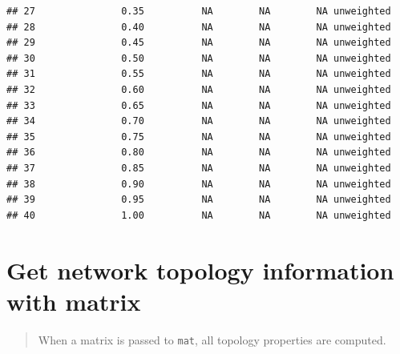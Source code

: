 \documentclass[
]{book}
\begin{document}
\begin{verbatim}
## 27               0.35          NA        NA        NA unweighted
## 28               0.40          NA        NA        NA unweighted
## 29               0.45          NA        NA        NA unweighted
## 30               0.50          NA        NA        NA unweighted
## 31               0.55          NA        NA        NA unweighted
## 32               0.60          NA        NA        NA unweighted
## 33               0.65          NA        NA        NA unweighted
## 34               0.70          NA        NA        NA unweighted
## 35               0.75          NA        NA        NA unweighted
## 36               0.80          NA        NA        NA unweighted
## 37               0.85          NA        NA        NA unweighted
## 38               0.90          NA        NA        NA unweighted
## 39               0.95          NA        NA        NA unweighted
## 40               1.00          NA        NA        NA unweighted
\end{verbatim}

\section{Get network topology information with matrix}\label{get-network-topology-information-with-matrix}

\begin{quote}
When a matrix is passed to \texttt{mat}, all topology properties are computed.
\end{quote}
\end{document}
